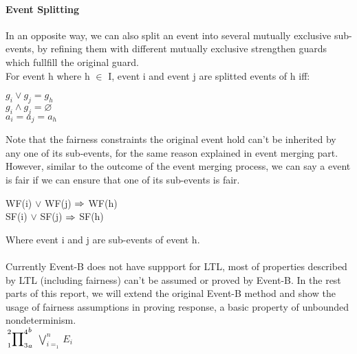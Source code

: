\paragraph{Event Splitting}
In an opposite way, we can also split an event into several mutually exclusive sub-events, by refining them with different mutually exclusive strengthen guards which fullfill the original guard. \\
For event h where h $\in$ I, event i and event j are splitted events of h iff:
\begin{center} 
$g_{i} \lor{g_{j}} = g_{h}$\\
$g_{i}\land{g_{j}} = \varnothing$\\
$a_{i} = a_{j} = a_{h}$
\end{center}
Note that the fairness constraints the original event hold can't be inherited by any one of its sub-events, for the same reason explained in event merging part. However, similar to the outcome of the event merging process, we can say a event is fair if we can ensure that one of its sub-events is fair.
\begin{center} 
WF(i) $\lor$ WF(j) $\Rightarrow$  WF(h)\\
SF(i) $\lor$ SF(j) $\Rightarrow$  SF(h)
\end{center}
Where event i and j are sub-events of event h.\\\\
Currently Event-B does not have suppport for LTL, most of properties described by LTL (including fairness) can't be assumed or proved by Event-B. In the rest parts of this report, we will extend the original Event-B method and show the usage of fairness assumptions in proving response, a basic property of unbounded nondeterminism.\\


 	$\sideset{_1^2}{_3^4}\prod_a^b$
 	$\bigvee_{i=_1}^n E_i$